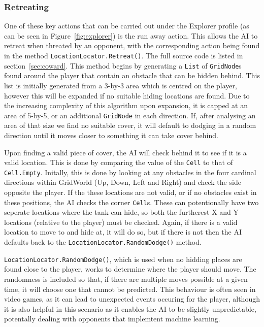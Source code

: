 \documentclass[11pt]{article}
\begin{document}
\subsubsection{Retreating}

One of these key actions that can be carried out under the Explorer profile (as can be seen in Figure~\ref{fig:explorer}) is the run away action. This allows the AI to retreat when threated by an opponent, with the corresponding action being found in the method \verb|LocationLocator.Retreat()|. The full source code is listed in section~\ref{sec:coward}. This method begins by generating a \verb|List| of \verb|GridNode|s found around the player that contain an obstacle that can be hidden behind. This list is initially generated from a 3-by-3 area which is centred on the player, however this will be expanded if no suitable hiding locations are found. Due to the increasing complexity of this algorithm upon expansion\cite{GeorgeComplex}, it is capped at an area of 5-by-5, or an additional \verb|GridNode| in each direction. If, after analysing an area of that size we find no suitable cover, it will default to dodging in a random direction until it moves closer to something it can take cover behind.

Upon finding a valid piece of cover, the AI will check behind it to see if it is a valid location. This is done by comparing the value of the \verb|Cell| to that of \verb|Cell.Empty|. Initally, this is done by looking at any obstacles in the four cardinal directions within GridWorld (Up, Down, Left and Right) and check the side opposite the player. If the these locations are not valid, or if no obstacles exist in these positions, the AI checks the corner \verb|Cell|s. These can potentionally have two seperate locations where the tank can hide, so both the furtherest X and Y locations (relative to the player) must be checked. Again, if there is a valid location to move to and hide at, it will do so, but if there is not then the AI defaults back to the \verb|LocationLocator.RandomDodge()| method.

\verb|LocationLocator.RandomDodge()|, which is used when no hidding places are found close to the player, works to determine where the player should move. The randomness is included so that, if there are multiple moves possible at a given time, it will choose one that cannot be predicted. This behaviour is often seen in video games\cite{GeorgeRandom}, as it can lead to unexpected events occuring for the player, although it is also helpful in this scenario as it enables the AI to be slightly unpredictable, potentally dealing with opponents that implemtent machine learning.
\end{document}
